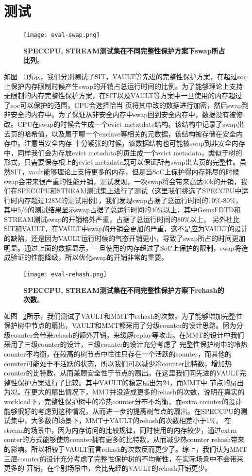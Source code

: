 \section{测试}
\begin{figure}[!htp]
    \centering
    \texttt{[image: eval-swap.png]}
    \caption{\textbf{SPECCPU, STREAM测试集在不同完整性保护方案下swap所占比列}。}
   \label{fig:eval-swap}
\end{figure}
如图 ~\ref{fig:eval-swap}所示，我们分别测试了SIT，VAULT等先进的完整性保护方案，在超过soc上保护内存限制时候产生swap的开销占总运行时间的比例。为了能够理论上支持无限制的内存完整性保护方案，在SIT以及VAULT等方案中一旦使用的内存超过了soc可以保护的范围。CPU会选择恰当
页将其中改的数据进行加密，然后swap到非安全的内存中。为了保证从非安全内存中swap回到安全内存中，数据没有被修改。CPU在swap的时候会生成一个evict metatdate结构。该结构中记录了swap出去页的哈希值，以及属于哪一个enclave等相关的元数据，该结构被存储在安全内存中。注意当安全内存
十分紧张的时候，该数据结构也可能被swap到非安全内存中，同样我们会为存放evict metadata的页生成一个evict metadata，类似于树的形式，只需要保存根上的evict metadata既可以保证所有swap出去页的完整性。虽然SIT，vault能够理论上支持更多的内存，但是当SoC上保护得内存耗尽的时候
swap会带来很严重的性能开销，测试发现，一次swap将会带来高达40k的开销，我们在SPECCPU和STREAM测试集上进行了测试（这里我们挑选了SPECCPU中运行时内存超过128M的测试用例），我们发现swap占据了总运行时间的10\%-80\%，其中5/6的测试结果显示swap占据了总运行时间的40\%以上，其中GemsFDTD和STREAM测试swap的开销格外严重，占据了总运行时间的80\%以上，
另外杜比SIT和VAULT，在VAULT中swap的开销会更加的严重，这不是应为VAULT的设计的缺陷，还是因为VAULT运行时候的气态开销更小，导致了swap所占的时间更加明显。通过上面的数据显示，一旦使用的内存超过了SoC上保护的限制，swap将造成验证的性能降级，所以优化swap的开销非常的重要。

\begin{figure}[!htp]
    \centering
    \texttt{[image: eval-rehash.png]}
    \caption{\textbf{SPECCPU, STREAM测试集在不同完整性保护方案下rehash的次数}。}
   \label{fig:eval-rehash}
\end{figure}
如图 ~\ref{fig:eval-rehash}所示，我们测试了VAULT和MMT中rehash的次数。为了能够增加完整性保护树中节点的扇出，VAULT和MMT都采用了分级counter的设计思路。因为分级counter会带来rehash的额外开销，来缓解replay等攻击。在MMT的设计中我们采用了三级counter的设计，三级counter的设计充分考虑了
完整性保护树中的冷热counter不均衡，在较高的树节点中往往只存在一个活跃的counter，而其他的counter可能处于不活跃的状态，所以我们可以减少冷counter比特数，增加热counter的比特数，从而兼顾安全性于节点的扇出。在这里我们同先进的VAULT完整性保护方案进行了比较。其中VAULT的稳定扇出为24，而MMT中
节点的扇出为32。在更大的扇出情况下，MMT并没造成更多的rehash的次数，说明在真实的workload下，完整性保护树中的冷热counter分布不均衡，而extra counter的设计能够很好的考虑到这种情况，从而进一步的提高树节点的扇出。在SPECCPU的测试集中，大多数的场景下，MMT于VAULT的rehash的次数相差小于1\%，
在stream的场景中，因为内存访问的比较规律，同时使用的内存较少，通过extra conter的方式能够使热counter拥有更多的比特数，从而减少热counter rehash带来的影响。所以相较于VAULT而言rehash的次数反而更少了。综上，我们认为MMT三层counter的设计充分考虑了完整性保护树的不均衡性，在实际场景中不会带来更多的
开销，在个别场景中，会比先经的VAULT的rehash开销更少。

